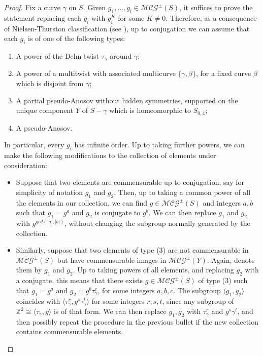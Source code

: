 \documentclass[svgnames]{amsart}
\theoremstyle{plain}
\theoremstyle{definition}
\newcommand{\MCG}{\mathcal{MCG}^\pm}
\begin{document}
\begin{proof} Fix a curve $\gamma$ on $S$. Given $g_1,\dots,g_l\in \MCG(S)$, it suffices to prove the statement replacing each $g_i$ with $g_i^K$ for some $K\neq 0$. Therefore, as a consequence of Nielsen-Thurston classification (see \cite[Corollary 13.3]{FarbMargalit}), up to conjugation we can assume that each $g_i$ is of one of the following types:
 \begin{enumerate}
  \item A power of the Dehn twist $\tau_\gamma$ around $\gamma$;
  \item A power of a multitwist with associated multicurve $\{\gamma,\beta\}$, for a fixed curve $\beta$ which is disjoint from $\gamma$;
  \item A partial pseudo-Anosov without hidden symmetries, supported on the unique component $Y$ of $S-\gamma$ which is homeomorphic to $S_{0,4}$;
  \item A pseudo-Anosov.
 \end{enumerate}
In particular, every $g_i$ has infinite order. Up to taking further powers, we can make the following modifications to the collection of elements under consideration:
 \begin{itemize}
     \item  Suppose that two elements are commensurable up to conjugation, say for simplicity of notation $g_1$ and $g_2$. Then, up to taking a common power of all the elements in our collection, we can find $g\in \MCG(S)$ and integers $a,b$ such that $g_1=g^a$ and $g_2$ is conjugate to $g^b$. We can then replace $g_1$ and $g_2$ with $g^{gcd(|a|,|b|)}$, without changing the subgroup normally generated by the collection.
     \item  Similarly, suppose that two elements of type (3) are not commensurable in $\MCG(S)$ but have commensurable images in $\MCG(Y)$. Again, denote them by $g_1$ and $g_2$. Up to taking powers of all elements, and replacing $g_2$ with a conjugate, this means that there exists $g\in \MCG(S)$ of type (3) such that $g_1=g^a$ and $g_2=g^b\tau_\gamma^c$, for some integers $a,b,c$. The subgroup $\langle g_1,g_2\rangle$ coincides with $\langle\tau_\gamma^r, g^s\tau_\gamma^t\rangle$ for some integers $r,s,t$, since any subgroup of $\mathbb Z^2\cong \langle \tau_\gamma,g\rangle$ is of that form. We can then replace $g_1,g_2$ with $\tau_\gamma^r$ and $g^s\gamma^t$, and then possibly repeat the procedure in the previous bullet if the new collection contains commensurable elements.
 \end{itemize}

\end{proof}
\end{document}
